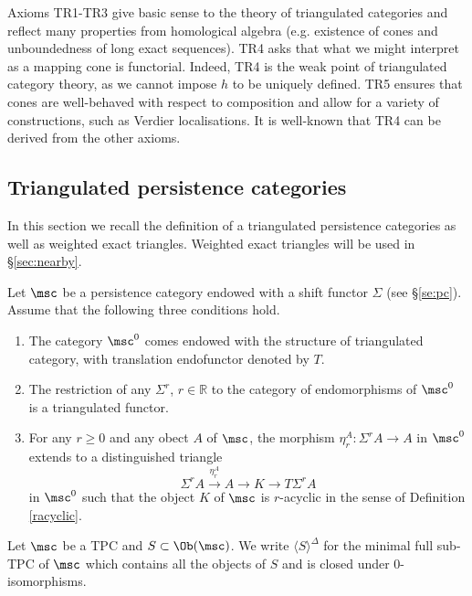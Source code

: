 \begin{remark}
    Axioms TR1-TR3 give basic sense to the theory of triangulated categories and reflect many properties from homological algebra (e.g. existence of cones and unboundedness of long exact sequences). TR4 asks that what we might interpret as a mapping cone is  functorial. Indeed, TR4 is the weak point of triangulated category theory, as we cannot impose $h$ to be uniquely defined. TR5 ensures that cones are well-behaved with respect to composition and allow for a variety of constructions, such as Verdier localisations. It is well-known that TR4 can be derived from the other axioms.
\end{remark}

\subsection{Triangulated persistence categories}

In this section we recall the definition of a triangulated persistence categories as well as weighted exact triangles. Weighted exact triangles will be used in \S\ref{sec:nearby}.

\begin{dfn}\label{def:tpc}
    Let $\msc$ be a persistence category endowed with a shift functor $\Sigma$ (see \S\ref{se:pc}). Assume that the following three conditions hold.
    \begin{enumerate}
        \item The category $\msc^0$ comes endowed with the structure of triangulated category, with translation endofunctor denoted by $T$.
        \item The restriction of any $\Sigma^r$, $r\in \mathbb{R}$ to the category of endomorphisms of $\msc^0$ is a triangulated functor.
        \item For any $r\geq 0$ and any obect $A$ of $\msc$, the morphism $\eta^A_r\colon \Sigma^rA\to A$ in $\msc^0$ extends to a distinguished triangle $$\Sigma^rA\xrightarrow{\eta_r^A}A\to K\to T\Sigma^rA$$ in $\msc^0$ such that the object $K$ of $\msc$ is $r$-acyclic in the sense of Definition \ref{racyclic}.
    \end{enumerate}
\end{dfn}

\begin{dfn}\label{trcompl}
Let $\msc$ be a TPC and $S \subset \Ob(\msc)$. We write
$\langle S \rangle^{\Delta}$ for the minimal full sub-TPC of $\msc$
which contains all the objects of $S$ and is closed under
$0$-isomorphisms.
\end{dfn}

